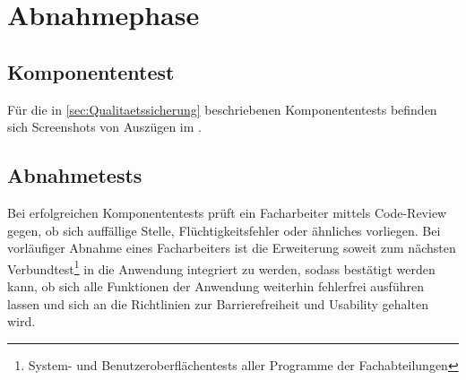 \section{Abnahmephase} 
\label{sec:Abnahmephase}

\subsection{Komponententest}

Für die in \ref{sec:Qualitaetssicherung} beschriebenen Komponententests befinden sich Screenshots von Auszügen im .

\subsection{Abnahmetests}

Bei erfolgreichen Komponententests prüft ein Facharbeiter mittels Code-Review gegen, ob sich auffällige Stelle, Flüchtigkeitsfehler oder ähnliches vorliegen. Bei vorläufiger Abnahme eines Facharbeiters ist die Erweiterung soweit zum nächsten Verbundtest\footnote{System- und Benutzeroberflächentests aller Programme der Fachabteilungen} in die Anwendung integriert zu werden, sodass bestätigt werden kann, ob sich alle Funktionen der Anwendung weiterhin fehlerfrei ausführen lassen und sich an die Richtlinien zur Barrierefreiheit und Usability gehalten wird.



